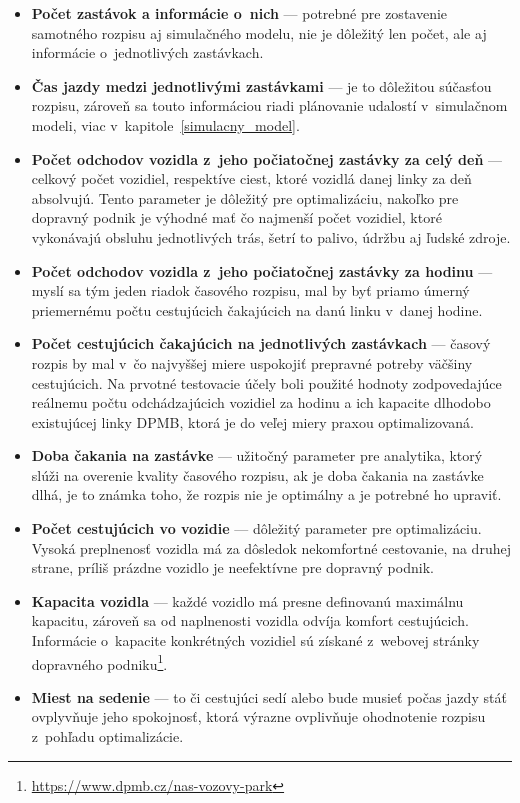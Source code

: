 \begin{itemize}
  \item \textbf{Počet zastávok a informácie o~nich} --- potrebné pre zostavenie samotného rozpisu aj simulačného modelu, nie je dôležitý len počet, ale aj informácie o~jednotlivých zastávkach.
  \item \textbf{Čas jazdy medzi jednotlivými zastávkami} --- je to dôležitou súčasťou rozpisu, zároveň sa touto informáciou riadi plánovanie udalostí v~simulačnom modeli, viac v~kapitole~\ref{simulacny_model}.
  \item \textbf{Počet odchodov vozidla z~jeho počiatočnej zastávky za celý deň} --- celkový počet vozidiel, respektíve ciest, ktoré vozidlá danej linky za deň absolvujú. Tento parameter je dôležitý pre optimalizáciu, nakoľko pre dopravný podnik je výhodné mať čo najmenší počet vozidiel, ktoré vykonávajú obsluhu jednotlivých trás, šetrí to palivo, údržbu aj ľudské zdroje.
  \item \textbf{Počet odchodov vozidla z~jeho počiatočnej zastávky za hodinu} --- myslí sa tým jeden riadok časového rozpisu, mal by byť priamo úmerný priemernému počtu cestujúcich čakajúcich na danú linku v~danej hodine.
  \item \textbf{Počet cestujúcich čakajúcich na jednotlivých zastávkach} --- časový rozpis by mal v~čo najvyššej miere uspokojiť prepravné potreby väčšiny cestujúcich. Na prvotné testovacie účely boli použité hodnoty zodpovedajúce reálnemu počtu odchádzajúcich vozidiel za hodinu a ich kapacite dlhodobo existujúcej linky DPMB, ktorá je do veľej miery praxou optimalizovaná.
  \item \textbf{Doba čakania na zastávke} --- užitočný parameter pre analytika, ktorý slúži na overenie kvality časového rozpisu, ak je doba čakania na zastávke dlhá, je to známka toho, že rozpis nie je optimálny a je potrebné ho upraviť.
  \item \textbf{Počet cestujúcich vo vozidie} --- dôležitý parameter pre optimalizáciu. Vysoká preplnenosť vozidla má za dôsledok nekomfortné cestovanie, na druhej strane, príliš prázdne vozidlo je neefektívne pre dopravný podnik.
  \item \textbf{Kapacita vozidla} --- každé vozidlo má presne definovanú maximálnu kapacitu, zároveň sa od naplnenosti vozidla odvíja komfort cestujúcich. Informácie o~kapacite konkrétných vozidiel sú získané z~webovej stránky dopravného podniku\footnote{\url{https://www.dpmb.cz/nas-vozovy-park}}.
  \item \textbf{Miest na sedenie} --- to či cestujúci sedí alebo bude musieť počas jazdy stáť ovplyvňuje jeho spokojnosť, ktorá výrazne ovplivňuje ohodnotenie rozpisu z~pohľadu optimalizácie.

\end{itemize}
